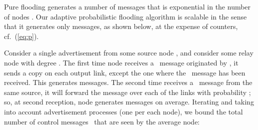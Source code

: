 \documentclass[conference]{IEEEtran}
\newcommand{\N}{N}
\newcommand{\FW}{\text{ADV}}
\begin{document}
\begin{comment}
The most simple technique is \emph{pure flooding}\cite{Matei02Ic}. The semantic is such that every time an intermediate node receives \FW\ frame, it sends a copy on every output link it owns. The need of a termination parameter arises, and it is connected to the length (in term of links) of the discovered path. So, if a message has traversed more than \ML\ links it gets discarded. We may retrieve an analytical expression on the number of messages produced by this technique:

From eq. \eqref{eqn:boundfl}, we can note as number of messages increases exponentially in function of \ML, making the algorithm really sensible to parameter variation; moreover, \ML\ is strictly connected to \N: as \N\ increases paths are to be longer, so scalability of the algorithm is not preserved. With such technique nodes have to store no variables in order to run the algorithm: needed state is null.

Fixed flooding an intermediate node that receives \FW\ frame sends a copy on every link, extracting a probability \PB, said \emph{probability of flooding}. Retention parameter \ML\ is still necessary. In fact, setting \PB, every node just floods less the network, which would be anyway saturated by a storm of messages if \ML\ was set to . In order to give a proof of that, we can extract again an analytical bound to \nm:

As we can state from eq. \eqref{eqn:upperpr}, when \ML\ tends to  the same does number of messages. In this sense, we have again an exponential \nm\ growth (function of \ML) with two parameters to consider. That brings to a more complex protocol, not scalable and difficult to calibrate. Also in that case, stored state within every node is null, as no variable has to be maintained inside routers.


\end{comment}


Pure flooding generates a number of messages that is exponential in the number of nodes . 
 Our adaptive probabilistic flooding algorithm is scalable in the sense that it generates  only  messages, as shown below, at the expense of   counters, cf.~(\ref{eq:p}).

Consider a single advertisement from some source node , and consider some relay node  with degree . The first time node  receives a \FW\ message originated by , it sends a copy on each output link, except the one where the \FW\ message has been received. This generates   messages. The second time  receives a \FW\ message from the same source, it will forward the message over each of the  links with probability ; so, at second reception, node   generates  messages on average. 
Iterating and taking into account  advertisement processes (one per each node), we bound the total number of control messages \nm\ that are seen by the average node:
\end{document}
